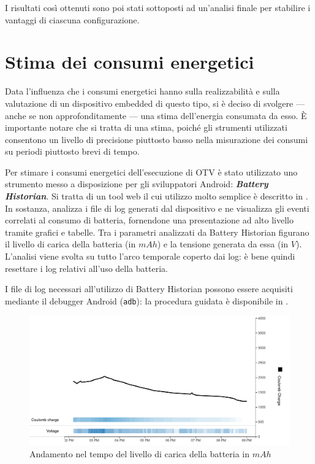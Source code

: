 \vspace{1em}

I risultati così ottenuti sono poi stati sottoposti ad un'analisi finale per stabilire i vantaggi di ciascuna configurazione. 

\section{Stima dei consumi energetici}
\label{sec:stimaconsumi}

Data l'influenza che i consumi energetici hanno sulla realizzabilità e sulla valutazione di un dispositivo embedded di questo
tipo, si è deciso di svolgere --- anche se non approfonditamente --- una stima dell'energia consumata da esso.
È importante notare che si tratta di una stima, poiché gli strumenti utilizzati consentono un livello di precisione piuttosto
basso nella misurazione dei consumi su periodi piuttosto brevi di tempo.

Per stimare i consumi energetici dell'esecuzione di OTV è stato utilizzato uno strumento messo a disposizione per gli 
sviluppatori Android: \textit{\textbf{Battery Historian}}. Si tratta di un tool web il cui utilizzo molto semplice è 
descritto in \cite{adev_battery}. In sostanza, analizza i file di log generati dal dispositivo e ne visualizza gli eventi
correlati al consumo di batteria, fornendone una presentazione ad alto livello tramite grafici e tabelle.
Tra i parametri analizzati da Battery Historian figurano il livello di carica della batteria (in $mAh$) e la tensione generata
da essa (in $V$). L'analisi viene svolta su tutto l'arco temporale coperto dai log: è bene quindi resettare i log relativi
all'uso della batteria.

I file di log necessari all'utilizzo di Battery Historian possono essere acquisiti mediante il debugger Android (\texttt{adb}): 
la procedura guidata è disponibile in \cite{adev_batlog}.

\begin{figure}[h!]
    \begin{center}
        \includegraphics[scale=0.38]{img/battery_historian_coulomb.png}
        \caption{Andamento nel tempo del livello di carica della batteria in $mAh$}
    \end{center}
\end{figure}

